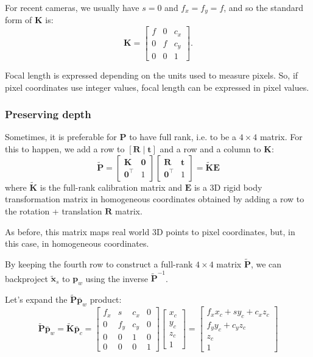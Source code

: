 For recent cameras, we usually have $s=0$ and $f_{x}=f_{y}=f$, and so the standard form of $\mathbf{K}$ is:
$$\mathbf{K}=\begin{bmatrix}
f & 0 & c_{x} \\
0 & f & c_{y} \\
0 & 0 & 1
\end{bmatrix}.$$

Focal length is expressed depending on the units used to measure pixels. So, if pixel coordinates use integer values, focal length can be expressed in pixel values.

\subsubsection{Preserving depth}
Sometimes, it is preferable for $\mathbf{P}$ to have full rank, i.e. to be a $4\times4$ matrix. For this to happen, we add a row to $[\mathbf{R} \mid \mathbf{t}]$ and a row and a column to $\mathbf{K}$:
$$\tilde{\mathbf{P}}=\begin{bmatrix}
\mathbf{K} & \mathbf{0} \\
\mathbf{0}^{\top} & 1
\end{bmatrix}
\begin{bmatrix}
\mathbf{R} & \mathbf{t} \\
\mathbf{0}^{\top} & 1
\end{bmatrix}=\tilde{\mathbf{K}}\mathbf{E}$$
where $\tilde{\mathbf{K}}$ is the full-rank calibration matrix and $\mathbf{E}$ is a 3D rigid body transformation matrix in homogeneous coordinates obtained by adding a row to the rotation + translation $\mathbf{R}$ matrix.

As before, this matrix maps real world 3D points to pixel coordinates, but, in this case, in homogeneous coordinates.

By keeping the fourth row to construct a full-rank $4 \times 4$ matrix $\tilde{\mathbf{P}}$, we can backproject $\tilde{\mathbf{x}}_{s}$ to $\mathbf{p}_{w}$ using the inverse $\tilde{\mathbf{P}}^{-1}$.

Let's expand the $\tilde{\mathbf{P}} \bar{\mathbf{p}}_w$ product:
$$\tilde{\mathbf{P}} \bar{\mathbf{p}}_w = \tilde{\mathbf{K}}\bar{\mathbf{p}}_{c} = \begin{bmatrix} f_x & s & c_x & 0 \\ 0 & f_y & c_y & 0 \\ 0 & 0 & 1 & 0 \\ 0 & 0 & 0 & 1 \end{bmatrix} \begin{bmatrix} x_c \\ y_c \\ z_c \\ 1 \end{bmatrix} = \begin{bmatrix} f_x x_c + s y_c + c_x z_c \\ f_y y_c + c_y z_c \\ z_c \\ 1 \end{bmatrix}$$

